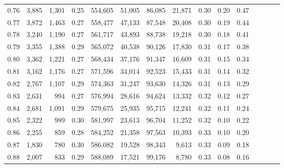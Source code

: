 \begin{tabular}{rrrcrrrrrrrrrrr}
0.76 &   3,885 &  1,301 &                                       0.25 &  554,605 &   51,005 &   86,085 &   21,871 &  0.30 &  0.20 &                         0.47 \\
0.77 &   3,872 &  1,463 &                                       0.27 &  558,477 &   47,133 &   87,548 &   20,408 &  0.30 &  0.19 &                         0.44 \\
0.78 &   3,240 &  1,190 &                                       0.27 &  561,717 &   43,893 &   88,738 &   19,218 &  0.30 &  0.18 &                         0.41 \\
0.79 &   3,355 &  1,388 &                                       0.29 &  565,072 &   40,538 &   90,126 &   17,830 &  0.31 &  0.17 &                         0.38 \\
0.80 &   3,362 &  1,221 &                                       0.27 &  568,434 &   37,176 &   91,347 &   16,609 &  0.31 &  0.15 &                         0.34 \\
0.81 &   3,162 &  1,176 &                                       0.27 &  571,596 &   34,014 &   92,523 &   15,433 &  0.31 &  0.14 &                         0.32 \\
0.82 &   2,767 &  1,107 &                                       0.29 &  574,363 &   31,247 &   93,630 &   14,326 &  0.31 &  0.13 &                         0.29 \\
0.83 &   2,631 &    994 &                                       0.27 &  576,994 &   28,616 &   94,624 &   13,332 &  0.32 &  0.12 &                         0.27 \\
0.84 &   2,681 &  1,091 &                                       0.29 &  579,675 &   25,935 &   95,715 &   12,241 &  0.32 &  0.11 &                         0.24 \\
0.85 &   2,322 &    989 &                                       0.30 &  581,997 &   23,613 &   96,704 &   11,252 &  0.32 &  0.10 &                         0.22 \\
0.86 &   2,255 &    859 &                                       0.28 &  584,252 &   21,358 &   97,563 &   10,393 &  0.33 &  0.10 &                         0.20 \\
0.87 &   1,830 &    780 &                                       0.30 &  586,082 &   19,528 &   98,343 &    9,613 &  0.33 &  0.09 &                         0.18 \\
0.88 &   2,007 &    833 &                                       0.29 &  588,089 &   17,521 &   99,176 &    8,780 &  0.33 &  0.08 &                         0.16 \\

\end{tabular}
